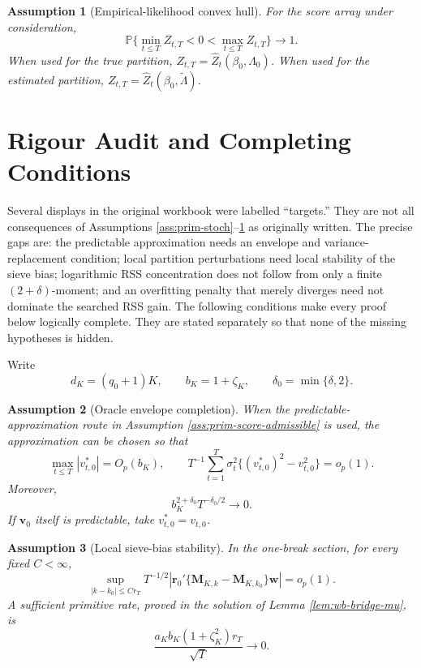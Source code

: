 \documentclass[12pt]{article}
\numberwithin{equation}{section}
\newtheorem{assumption}{Assumption}
\theoremstyle{definition}
\newcommand{\Pp}{\mathbb P}
\begin{document}
\begin{assumption}[Empirical-likelihood convex hull]
\label{ass:prim-convex}
For the score array under consideration,
\[
    \Pp\{\min_{t\leq T}Z_{t,T}<0<\max_{t\leq T}Z_{t,T}\}\to1.
\]
When used for the true partition, \(Z_{t,T}=\widehat Z_t(\beta_0,\Lambda_0)\). When used for the estimated partition, \(Z_{t,T}=\widehat Z_t(\beta_0,\widetilde\Lambda)\).
\end{assumption}


\section{Rigour Audit and Completing Conditions}
\label{sec:rigour-audit}

Several displays in the original workbook were labelled ``targets.''  They
are not all consequences of Assumptions \ref{ass:prim-stoch}--\ref{ass:prim-convex}
as originally written.  The precise gaps are: the predictable approximation
needs an envelope and variance-replacement condition; local partition
perturbations need local stability of the sieve bias; logarithmic RSS
concentration does not follow from only a finite \((2+\delta)\)-moment; and an
overfitting penalty that merely diverges need not dominate the searched RSS
gain.  The following conditions make every proof below logically complete.
They are stated separately so that none of the missing hypotheses is hidden.

Write
\[
    d_K=(q_0+1)K,
    \qquad b_K=1+\zeta_K,
    \qquad \delta_0=\min\{\delta,2\}.
\]

\begin{assumption}[Oracle envelope completion]
\label{ass:sol-oracle-envelope}
When the predictable-approximation route in Assumption
\ref{ass:prim-score-admissible} is used, the approximation can be chosen so
that
\[
    \max_{t\leq T}|v_{t,0}^\ast|=O_p(b_K),
    \qquad
    T^{-1}\sum_{t=1}^T\sigma_t^2
       \{(v_{t,0}^\ast)^2-v_{t,0}^2\}=o_p(1).
\]
Moreover,
\begin{equation}
    b_K^{2+\delta_0}T^{-\delta_0/2}\longrightarrow0.
    \label{eq:sol-envelope-rate}
\end{equation}
If \(\bm v_0\) itself is predictable, take \(v_{t,0}^\ast=v_{t,0}\).
\end{assumption}

\begin{assumption}[Local sieve-bias stability]
\label{ass:sol-local-bias}
In the one-break section, for every fixed \(C<\infty\),
\begin{equation}
    \sup_{|k-k_0|\leq Cr_T}
    T^{-1/2}\left|
      \bm r_0'\{\bm M_{K,k}-\bm M_{K,k_0}\}\bm w
    \right|=o_p(1).
    \label{eq:sol-local-bias}
\end{equation}
A sufficient primitive rate, proved in the solution of Lemma
\ref{lem:wb-bridge-mu}, is
\begin{equation}
    \frac{a_K b_K(1+\zeta_K^2)r_T}{\sqrt T}\longrightarrow0.
    \label{eq:sol-local-bias-sufficient}
\end{equation}
\end{assumption}
\end{document}
